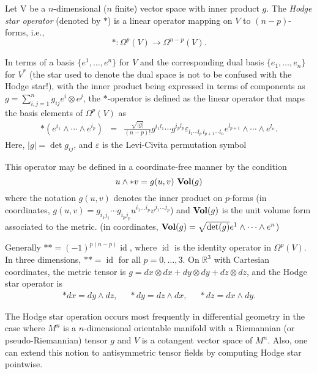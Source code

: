 \documentclass[12pt]{article}
\begin{document}
Let V be a $n$-dimensional ($n$ finite) vector space with inner product $g$.  The \emph{Hodge star operator} (denoted by $\ast$) is 
a linear operator mapping  on $V$ to $(n-p)$-forms, i.e., 
$$\ast : \Omega^p (V)\to \Omega^{n-p}(V).$$

In terms of a basis $\{e^1,\ldots, e^n\}$ for $V$ and the corresponding dual basis $\{e_1,\ldots, e_n\}$ for $V^*$ (the star used to denote the dual space is not to be confused with the Hodge star!), with the inner product being expressed in terms of components as
$g = \sum_{i,j = 1}^n g_{ij} e^i\otimes e^j$, the $\ast$-operator
is defined as the linear operator that maps the basis elements of $\Omega^p(V)$ as
\begin{eqnarray*}
\label{hodgedef}
\ast(e^{i_1} \wedge \cdots \wedge e^{i_p})\!\!\!\! &=& \!\!\!\!\frac{\sqrt{|g|}}{(n-p)!} g^{i_1 l_1}\cdots  g^{i_p l_p} \varepsilon_{l_1 \cdots l_p\, l_{p+1} \cdots l_n} e^{l_{p+1}}\wedge \cdots \wedge  e^{l_{n}}.
\end{eqnarray*}
Here, $|g|=\det g_{ij}$, and $\varepsilon$ is the Levi-Civita permutation symbol

This operator may be defined in a coordinate-free manner by the condition
 $$u \wedge *v = g (u, v) \, \mathop{\bf Vol}(g)$$
where the notation $g(u,v)$ denotes the inner product on $p$-forms (in coordinates, $g(u,v) = g_{i_1 j_1} \cdots g_{i_p j_p} u^{i_1 \ldots i_p} v^{j_1 \ldots j_p}$) and $\mathop{\bf Vol}(g)$ is the unit volume form associated to the metric. (in coordinates, $\mathop{\bf Vol}(g) = \sqrt {\operatorname{det}(g)} e^1 \wedge \cdots \wedge e^n$)

Generally $\ast \ast = (-1)^{p(n-p)} \operatorname{id}$, where $\operatorname{id}$ is the 
identity operator in $\Omega^p (V)$. In three dimensions, 
$\ast \ast = \operatorname{id}$ for all $p=0,\ldots,3$.
On $\mathbb{R}^3$  with Cartesian coordinates, the metric tensor is 
$g=dx\otimes dx + dy\otimes dy + dz\otimes dz$, and the Hodge 
star operator is 
\begin{eqnarray*}
 \ast dx = dy\wedge dz,\ \ \ \ \ \   \ast dy = dz\wedge dx,\ \ \ \ \ \  \ast dz = dx\wedge dy.
\end{eqnarray*}

The Hodge star operation occurs most frequently in differential geometry in the case where $M^n$ is a $n$-dimensional orientable manifold with 
a Riemannian (or pseudo-Riemannian) tensor $g$ and $V$ is a cotangent vector space of $M^n$.  Also, one can extend this notion to antisymmetric tensor fields by computing Hodge star pointwise.
\end{document}

